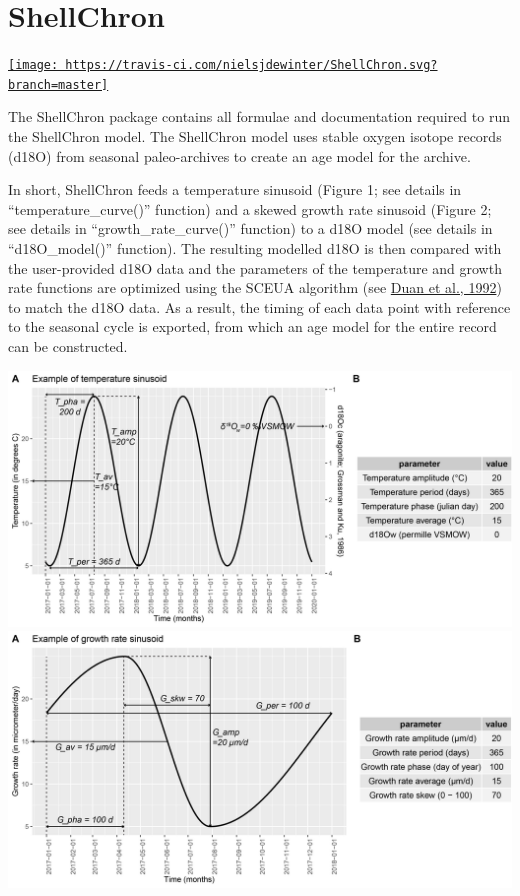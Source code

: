 \documentclass[
]{article}
\author{}
\date{\vspace{-2.5em}}
\begin{document}
\hypertarget{shellchron}{%
\section{ShellChron}\label{shellchron}}

\href{https://travis-ci.com/nielsjdewinter/ShellChron}{\texttt{[image: https://travis-ci.com/nielsjdewinter/ShellChron.svg?branch=master]}}

The ShellChron package contains all formulae and documentation required
to run the ShellChron model. The ShellChron model uses stable oxygen
isotope records (d18O) from seasonal paleo-archives to create an age
model for the archive.

In short, ShellChron feeds a temperature sinusoid (Figure 1; see details
in ``temperature\_curve()'' function) and a skewed growth rate sinusoid
(Figure 2; see details in ``growth\_rate\_curve()'' function) to a d18O
model (see details in ``d18O\_model()'' function). The resulting
modelled d18O is then compared with the user-provided d18O data and the
parameters of the temperature and growth rate functions are optimized
using the SCEUA algorithm (see
\href{https://doi.org/10.1029/91WR02985}{Duan et al., 1992}) to match
the d18O data. As a result, the timing of each data point with reference
to the seasonal cycle is exported, from which an age model for the
entire record can be constructed.

\includegraphics{man/figures/README-SSTcurve.png}
\includegraphics{man/figures/README-GRcurve.png}
\end{document}
